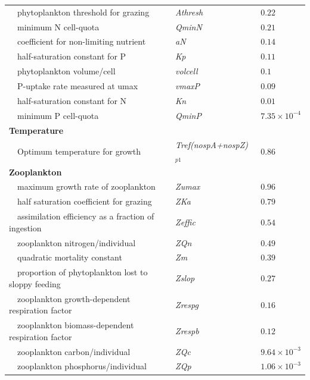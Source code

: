 \documentclass[review]{elsarticle}\usepackage[]{graphicx}\usepackage[]{color}
\begin{document}
\begin{table}[!tbp]
{\begin{center}
\begin{tabular}{lll}
~~phytoplankton threshold for grazing&\textit{Athresh}&$0.22$\tabularnewline
~~minimum N cell-quota&\textit{QminN}&$0.21$\tabularnewline
~~coefficient for non-limiting nutrient&\textit{aN}&$0.14$\tabularnewline
~~half-saturation constant for P&\textit{Kp}&$0.11$\tabularnewline
~~phytoplankton volume/cell&\textit{volcell}&$0.1$\tabularnewline
~~P-uptake rate measured at umax&\textit{vmaxP}&$0.09$\tabularnewline
~~half-saturation constant for N&\textit{Kn}&$0.01$\tabularnewline
~~minimum P cell-quota&\textit{QminP}&$7.35\times 10^{-4}$\tabularnewline
\hline
{\bfseries Temperature}&&\tabularnewline
~~Optimum temperature for growth&\textit{Tref(nospA+nospZ)$_{p1}$}&$0.86$\tabularnewline
\hline
{\bfseries Zooplankton}&&\tabularnewline
~~maximum growth rate of zooplankton&\textit{Zumax}&$0.96$\tabularnewline
~~half saturation coefficient for grazing&\textit{ZKa}&$0.79$\tabularnewline
~~assimilation efficiency as a fraction of ingestion&\textit{Zeffic}&$0.54$\tabularnewline
~~zooplankton nitrogen/individual&\textit{ZQn}&$0.49$\tabularnewline
~~quadratic mortality constant&\textit{Zm}&$0.39$\tabularnewline
~~proportion of phytoplankton lost to sloppy feeding&\textit{Zslop}&$0.27$\tabularnewline
~~zooplankton growth-dependent respiration factor&\textit{Zrespg}&$0.16$\tabularnewline
~~zooplankton biomass-dependent respiration factor&\textit{Zrespb}&$0.12$\tabularnewline
~~zooplankton carbon/individual&\textit{ZQc}&$9.64\times 10^{-3}$\tabularnewline
~~zooplankton phosphorus/individual&\textit{ZQp}&$1.06\times 10^{-3}$\tabularnewline
\hline
\end{tabular}\end{center}}
\end{table}
\end{document}
